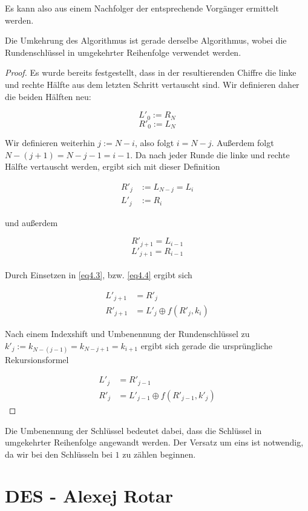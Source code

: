 \documentclass[
10pt, %
a4paper, %
oneside, %
headinclude,footinclude, %
BCOR5mm, %
]{scrartcl}
\begin{document}
	Es kann also aus einem Nachfolger der entsprechende Vorgänger ermittelt werden. \cite[51]{2}

	\begin{theorem}
	Die Umkehrung des Algorithmus ist gerade derselbe Algorithmus, wobei die Rundenschlüssel in umgekehrter Reihenfolge verwendet werden. 
	\label{t1}
	\end{theorem}

	\begin{proof}
	Es wurde bereits festgestellt, dass in der resultierenden Chiffre die linke und rechte Hälfte aus dem letzten Schritt vertauscht sind. Wir definieren daher die beiden Hälften neu:

	$$ L'_0 := R_N $$
	$$ R'_0 := L_N $$

	Wir definieren weiterhin $j := N-i$, also folgt $i = N-j$. Außerdem folgt $N-(j+1) = N-j-1 = i-1$. Da nach jeder Runde die linke und rechte Hälfte vertauscht werden, ergibt sich mit dieser Definition
	
	\begin{align*}
		R'_j &:= L_{N-j} = L_i \\
		L'_j &:= R_i
	\end{align*}

	und außerdem

	$$ R'_{j+1} = L_{i-1} $$
	$$ L'_{j+1} = R_{i-1} $$ \\
	
	Durch Einsetzen in \ref{eq4.3}, bzw. \ref{eq4.4} ergibt sich

	\begin{align*}
		L'_{j+1} &= R'_j \\
		R'_{j+1} &= L'_j \oplus f(R'_j, k_i)
	\end{align*}

	Nach einem Indexshift und Umbenennung der Rundenschlüssel zu $k'_j := k_{N-(j-1)} = k_{N-j+1} = k_{i+1}$ ergibt sich gerade die ursprüngliche Rekursionsformel
	
	\begin{align*}
		L'_j &= R'_{j-1} \\
		R'_j &= L'_{j-1} \oplus f(R'_{j-1}, k'_j)
	\end{align*}
\end{proof}

	Die Umbenennung der Schlüssel bedeutet dabei, dass die Schlüssel in umgekehrter Reihenfolge angewandt werden. Der Versatz um eins ist notwendig, da wir bei den Schlüsseln bei $1$ zu zählen beginnen.

\section{DES - Alexej Rotar}
  
\end{document}
